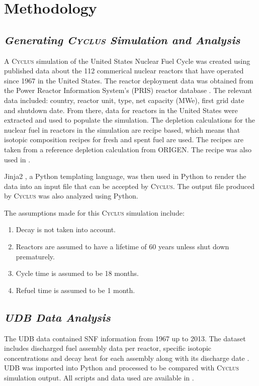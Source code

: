 \documentclass{anstrans}
\newcommand{\Cyclus}{\textsc{Cyclus}\xspace}%
\begin{document}
\section{Methodology}
\subsection{\textit{Generating \Cyclus Simulation and Analysis}}
A \Cyclus simulation of the United States Nuclear Fuel Cycle was created using published data about the 112 commerical nuclear reactors that have operated since 1967 in the United States. The reactor deployment data was obtained from the Power Reactor Information System's (PRIS) reactor database \cite{IAEA_pris_2017}. The relevant data included: country, reactor unit, type, net capacity (MWe), first grid date and shutdown date. From there, data for reactors in the United States were extracted and used to populate the simulation. The depletion calculations for the nuclear fuel in reactors in the simulation are recipe based, which means that isotopic composition recipes for fresh and spent fuel are used. The recipes are taken from a reference depletion calculation from ORIGEN. The recipe was also used in \cite{wilson_adoption_2009, bae_synergistic_2017}. 

Jinja2 \cite{ronacher_welcome_2018}, a Python templating language, was then used in Python to render the data into an input file that can be accepted by \Cyclus. The output file produced by \Cyclus was also analyzed using Python. 

The assumptions made for this \Cyclus simulation include: 

\begin{enumerate}
	\item Decay is not taken into account. 
	\item Reactors are assumed to have a lifetime of 60 years unless shut down prematurely.
	\item Cycle time is assumed to be 18 months. 
	\item Refuel time is assumed to be 1 month. 
\end{enumerate}


\subsection{\textit{UDB Data Analysis}}
The UDB data contained SNF information from 1967 up to 2013. The dataset includes discharged fuel assembly data per reactor, specific isotopic concentrations and decay heat for each assembly along with its discharge date \cite{peterson_unf-st&dards_2017}. UDB was imported into Python and processed to be compared with \Cyclus simulation output. All scripts and data used are available in \cite{chee_arfc/transition-scenarios_2018}. 
\end{document}
